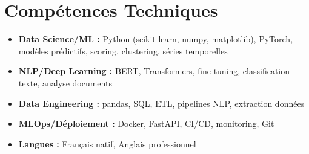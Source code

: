 \documentclass[a4paper,11pt]{article}
\begin{document}
\section{Comp\'etences Techniques}
\begin{itemize}[leftmargin=*, nosep]
    \item \small{\textbf{Data Science/ML :} Python (scikit-learn, numpy, matplotlib), PyTorch, mod\`eles pr\'edictifs, scoring, clustering, s\'eries temporelles}
    \item \small{\textbf{NLP/Deep Learning :} BERT, Transformers, fine-tuning, classification texte, analyse documents}
    \item \small{\textbf{Data Engineering :} pandas, SQL, ETL, pipelines NLP, extraction donn\'ees}
    \item \small{\textbf{MLOps/D\'eploiement :} Docker, FastAPI, CI/CD, monitoring, Git}
    \item \small{\textbf{Langues :} Fran\c cais natif, Anglais professionnel}
\end{itemize}
\end{document}
